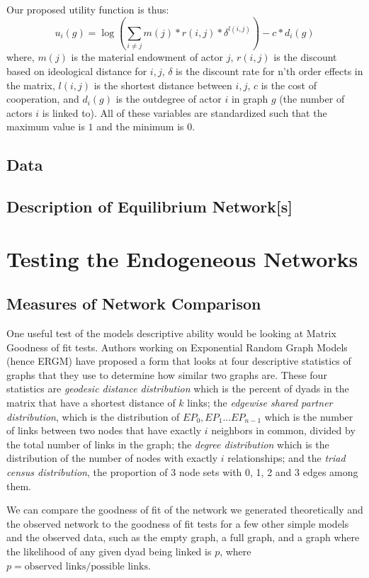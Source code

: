 \documentclass[12pt,onesided,fullpage]{amsart}
\begin{document}
Our proposed utility function is thus:
\begin{equation}
u_{i}(g) = \log (\sum_{i \neq j}  m(j)*r(i,j)*\delta^{l(i,j)}) - c*d_{i}(g)
\end{equation}
where, $m(j)$ is the material endowment of actor $j$, $r(i,j)$ is the discount based on ideological distance for $i, j$, $\delta$ is the discount rate for n'th order effects in the matrix, $l(i,j)$ is the shortest distance between $i, j$, $c$ is the cost of cooperation, and $d_{i}(g)$ is the outdegree of actor $i$ in graph $g$ (the number of actors $i$ is linked to). All of these variables are standardized such that the maximum value is $1$ and the minimum is $0$.

\subsection{Data}
\subsection{Description of Equilibrium Network[s]}


\section{Testing the Endogeneous Networks}
\subsection{Measures of Network Comparison}
One useful test of the models descriptive ability would be looking at Matrix Goodness of fit tests. Authors working on Exponential Random Graph Models (hence ERGM) have proposed a form that looks at four descriptive statistics of graphs that they use to determine how similar two graphs are. These four statistics are \emph{geodesic distance distribution} which is the percent of dyads in the matrix that have a shortest distance of $k$ links; the \emph{edgewise shared partner distribution}, which is the distribution of $EP_0, EP_1...EP_{n-1}$ which is the number of links between two nodes that have exactly $i$ neighbors in common, divided by the total number of links in the graph; the \emph{degree distribution} which is the distribution of the number of nodes with exactly $i$ relationships; and the \emph{triad census distribution}, the proportion of 3 node sets with 0, 1, 2 and 3 edges among them.

We can compare the goodness of fit of the network we generated theoretically and the observed network to the goodness of fit tests for a few other simple models and the observed data, such as the empty graph, a full graph, and a graph where the likelihood of any given dyad being linked is $p$, where $p = \text{observed links}/\text{possible links}$.
\end{document}
